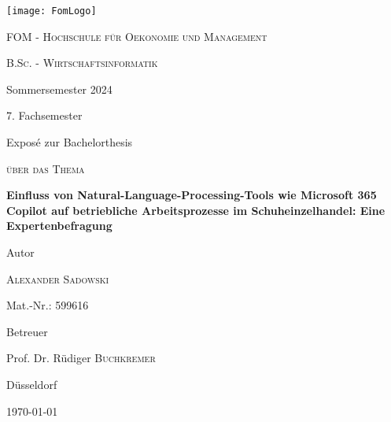
\begin{titlepage}
	
	\centering
	\texttt{[image: FomLogo]}\par\vspace{1cm}
	{\scshape\LARGE FOM - Hochschule für Oekonomie und Management \par}
	\vspace{1cm}
	{\scshape B.Sc. - Wirtschaftsinformatik\par Sommersemester 2024\par 7. Fachsemester\par Exposé zur Bachelorthesis\par}
	\vspace{1cm}
	{\scshape über das Thema\par}
	\vspace{1cm}
	{\large\bfseries Einfluss von Natural-Language-Processing-Tools wie Microsoft 365 Copilot auf betriebliche Arbeitsprozesse im Schuheinzelhandel: Eine Expertenbefragung\par}
	\vspace{1.5cm}
	Autor\par
	{\large\textsc{Alexander Sadowski}\par}
	Mat.-Nr.: 599616\par
	\vfill
	Betreuer\par
	Prof. Dr. Rüdiger \textsc{Buchkremer}
	
	\vfill
	
	{Düsseldorf\par \today \par}
\end{titlepage}